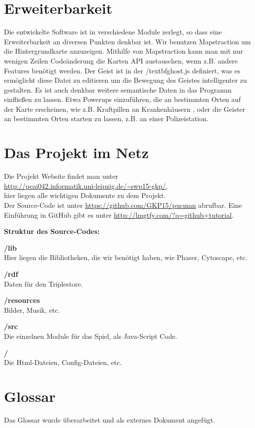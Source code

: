 \documentclass[11pt,a4paper]{article}
\begin{document}
\section{Erweiterbarkeit}
Die entwickelte Software ist in verschiedene Module zerlegt, so dass eine Erweiterbarkeit an diversen Punkten denkbar ist.
Wir benutzen Mapstraction um die Hintergrundkarte anzuzeigen.
Mithilfe von Mapstraction kann man mit nur wenigen Zeilen Codeänderung die Karten API austauschen, wenn z.B. andere Features benötigt werden.
Der Geist ist in der /textbf{ghost.js} definiert, was es ermöglicht diese Datei zu editieren um die Bewegung des Geistes intelligenter zu gestalten.
Es ist auch denkbar weitere semantische Daten in das Programm einfließen zu lassen. Etwa Powerups einzuführen, die an bestimmten Orten auf der Karte erscheinen, wie z.B. Kraftpillen an Krankenhäusern , oder die Geister an bestimmten Orten starten zu lassen, z.B. an einer Polizeistation.
\clearpage
\section{Das Projekt im Netz}
Die Projekt Website findet man unter \\ \url{http://pcai042.informatik.uni-leipzig.de/~swp15-gkp/}, \\ hier liegen alle wichtigen Dokumente zu dem Projekt.\\
Der Source-Code ist unter \url{https://github.com/GKP15/pucman} abrufbar. Eine Einführung in GitHub gibt es unter \url{http://lmgtfy.com/?q=github+tutorial}.
 \par\bigskip
{\flushleft \textbf{Struktur des Source-Codes:}} \par\bigskip
{\flushleft \textbf{/lib}} \\
Hier liegen die Bibliotheken, die wir benötigt haben, wie Phaser, Cytoscape, etc. \par\bigskip
{\flushleft \textbf{/rdf}} \\
Daten für den Triplestore. \par\bigskip
{\flushleft \textbf{/resources}} \\
Bilder, Musik, etc. \par\bigskip
{\flushleft \textbf{/src}} \\
Die einzelnen Module für das Spiel, als Java-Script Code. \par\bigskip
{\flushleft \textbf{/}} \\
Die Html-Dateien, Config-Dateien, etc.  



\section{Glossar}
Das Glossar wurde überarbeitet und als externes Dokument angefügt.
\end{document}
